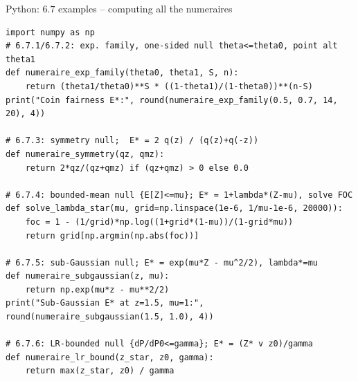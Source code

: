 \documentclass[aspectratio=169,10pt]{beamer}
\begin{document}
\begin{frame}[fragile]{Python: $6.7$ examples -- computing all the numeraires}

\begin{lstlisting}
import numpy as np
# 6.7.1/6.7.2: exp. family, one-sided null theta<=theta0, point alt theta1
def numeraire_exp_family(theta0, theta1, S, n):
    return (theta1/theta0)**S * ((1-theta1)/(1-theta0))**(n-S)
print("Coin fairness E*:", round(numeraire_exp_family(0.5, 0.7, 14, 20), 4))

# 6.7.3: symmetry null;  E* = 2 q(z) / (q(z)+q(-z))
def numeraire_symmetry(qz, qmz):
    return 2*qz/(qz+qmz) if (qz+qmz) > 0 else 0.0

# 6.7.4: bounded-mean null {E[Z]<=mu}; E* = 1+lambda*(Z-mu), solve FOC
def solve_lambda_star(mu, grid=np.linspace(1e-6, 1/mu-1e-6, 20000)):
    foc = 1 - (1/grid)*np.log((1+grid*(1-mu))/(1-grid*mu))
    return grid[np.argmin(np.abs(foc))]

# 6.7.5: sub-Gaussian null; E* = exp(mu*Z - mu^2/2), lambda*=mu
def numeraire_subgaussian(z, mu):
    return np.exp(mu*z - mu**2/2)
print("Sub-Gaussian E* at z=1.5, mu=1:", round(numeraire_subgaussian(1.5, 1.0), 4))

# 6.7.6: LR-bounded null {dP/dP0<=gamma}; E* = (Z* v z0)/gamma
def numeraire_lr_bound(z_star, z0, gamma):
    return max(z_star, z0) / gamma
\end{lstlisting}
\end{frame}
\end{document}
